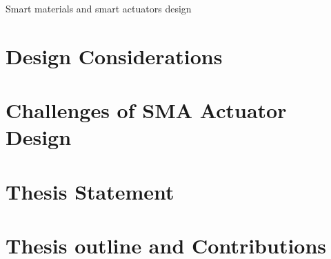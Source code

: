 

Smart materials and smart actuators design
\section*{Design Considerations}

\section*{Challenges of SMA Actuator Design}

\section*{Thesis Statement}

\section*{Thesis outline and Contributions}
